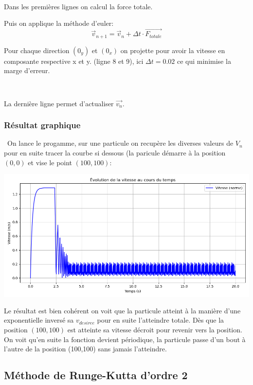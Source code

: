 \documentclass[a4paper,12pt]{article}
\begin{document}
\noindent Dans les premières lignes on calcul la force totale.

\noindent Puis on applique la méthode d'euler:
\begin{equation}
    \vec{v}_{n+1} = \vec{v}_n + \Delta t \cdot \vec{F_{totale}}
\end{equation}

\noindent Pour chaque direction $(0_y)$ et $(0_x)$ on projette pour avoir la vitesse en composante respective x et y. (ligne 8 et 9), ici $\Delta t = 0.02$ ce qui minimise la marge d'erreur.

\

\noindent La dernière ligne permet d'actualiser $\vec{v_n}$.

\subsubsection{Résultat graphique}
\
On lance le progamme, sur une particule on recupère les diverses valeurs de $V_n$ pour en suite tracer la courbe si dessous (la paricule démarre à la position $(0,0)$ et vise le point $(100,100)$:


\includegraphics[width=\textwidth]{graph_vitesse.png} %

Le résultat est bien cohérent on voit que la particule atteint à la manière d'une exponentielle inversé sa $v_{desiree}$ pour en suite l'atteindre totale. Dès que la position $(100,100)$ est atteinte sa vitesse décroit pour revenir vers la position. On voit qu'en suite la fonction devient périodique, la particule passe d'un bout à l'autre de la position (100,100) sans jamais l'atteindre.


\subsection*{Méthode de Runge-Kutta d'ordre 2}
\end{document}

